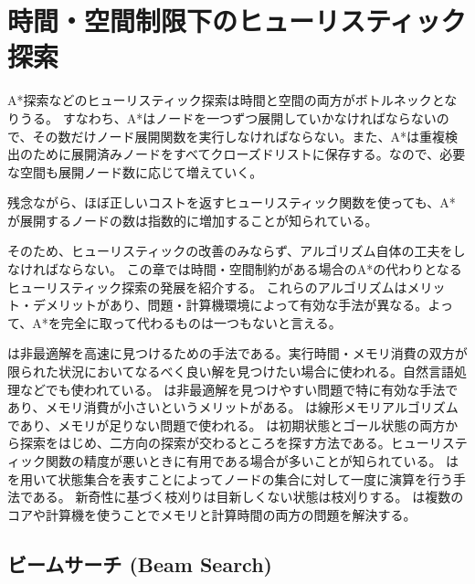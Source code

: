 \chapter{時間・空間制限下のヒューリスティック探索}
\label{ch:heuristic-search-variants}


A*探索などのヒューリスティック探索は時間と空間の両方がボトルネックとなりうる。
すなわち、A*はノードを一つずつ展開していかなければならないので、その数だけノード展開関数を実行しなければならない。また、A*は重複検出のために展開済みノードをすべてクローズドリストに保存する。なので、必要な空間も展開ノード数に応じて増えていく。

残念ながら、ほぼ正しいコストを返すヒューリスティック関数を使っても、A*が展開するノードの数は指数的に増加することが知られている\cite{helmert:08}。

そのため、ヒューリスティックの改善のみならず、アルゴリズム自体の工夫をしなければならない。
この章では時間・空間制約がある場合のA*の代わりとなるヒューリスティック探索の発展を紹介する。
これらのアルゴリズムはメリット・デメリットがあり、問題・計算機環境によって有効な手法が異なる。よって、A*を完全に取って代わるものは一つもないと言える。

は非最適解を高速に見つけるための手法である。実行時間・メモリ消費の双方が限られた状況においてなるべく良い解を見つけたい場合に使われる。自然言語処理などでも使われている。
は非最適解を見つけやすい問題で特に有効な手法であり、メモリ消費が小さいというメリットがある。
は線形メモリアルゴリズムであり、メモリが足りない問題で使われる。
は初期状態とゴール状態の両方から探索をはじめ、二方向の探索が交わるところを探す方法である。ヒューリスティック関数の精度が悪いときに有用である場合が多いことが知られている。
はを用いて状態集合を表すことによってノードの集合に対して一度に演算を行う手法である。
新奇性に基づく枝刈りは目新しくない状態は枝刈りする。
は複数のコアや計算機を使うことでメモリと計算時間の両方の問題を解決する。

\section{ビームサーチ (Beam Search)}

